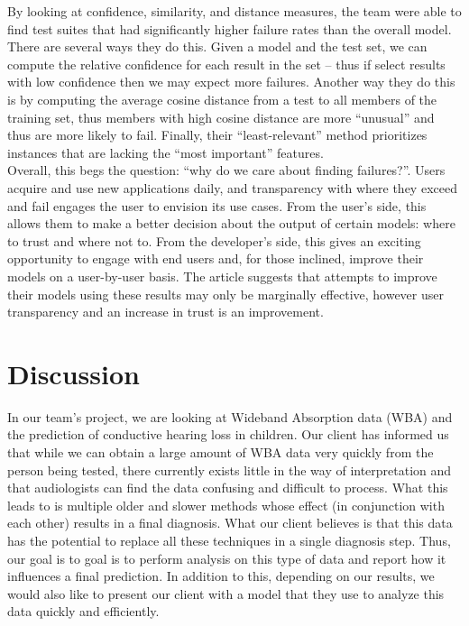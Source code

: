 \documentclass[a4paper]{article}
\begin{document}
By looking at confidence, similarity, and distance measures, the team were able to find test suites that had significantly higher failure rates than the overall model. There are several ways they do this. Given a model and the test set, we can compute the relative confidence for each result in the set – thus if select results with low confidence then we may expect more failures. Another way they do this is by computing the average cosine distance from a test to all members of the training set, thus members with high cosine distance are more “unusual” and thus are more likely to fail. Finally, their “least-relevant” method prioritizes instances that are lacking the “most important” features. \\

Overall, this begs the question: “why do we care about finding failures?”. Users acquire and use new applications daily, and transparency with where they exceed and fail engages the user to envision its use cases. From the user’s side, this allows them to make a better decision about the output of certain models: where to trust and where not to. From the developer's side, this gives an exciting opportunity to engage with end users and, for those inclined, improve their models on a user-by-user basis. The article suggests that attempts to improve their models using these results may only be marginally effective, however user transparency and an increase in trust is an improvement.
\section*{Discussion}
In our team’s project, we are looking at Wideband Absorption data (WBA) and the prediction of conductive hearing loss in children. Our client has informed us that while we can obtain a large amount of WBA data very quickly from the person being tested, there currently exists little in the way of interpretation and that audiologists can find the data confusing and difficult to process. What this leads to is multiple older and slower methods whose effect (in conjunction with each other) results in a final diagnosis. What our client believes is that this data has the potential to replace all these techniques in a single diagnosis step. Thus, our goal is to goal is to perform analysis on this type of data and report how it influences a final prediction. In addition to this, depending on our results, we would also like to present our client with a model that they use to analyze this data quickly and efficiently. \\
\end{document}

